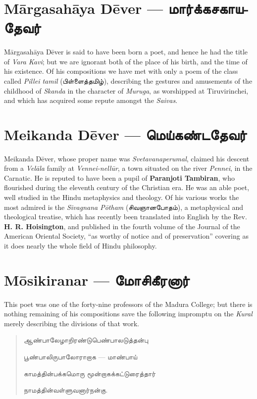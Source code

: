 \documentclass{article}
\newcommand{\TamilText}[1]{\texttamil{#1}}
\newcommand{\TamilBold}[1]{\texttamil{\textbf{#1}}}
\newcommand{\tam}[1]{\TamilText{#1}}
\newcommand{\tambold}[1]{\TamilBold{#1}}
\begin{document}
\section{M\={a}rgasah\={a}ya D\={e}ver --- \tambold{மார்க்கசகாயதேவர்}}
\paragraph{}
M\={a}rgasah\={a}ya D\={e}ver is said to have been born a poet, and hence he had the title of \emph{Vara Kavi}; but we are ignorant both of the place of his birth, and the time of his existence. Of his compositions we have met with only a poem of the class called \emph{Pillei tamil} (\tam{பிள்ளைத்தமிழ்}), describing the gestures and amusements of the childhood of \emph{Skanda} in the character of \emph{Muruga}, as worshipped at Tiruvirinchei, and which has acquired some repute amongst the \emph{Saivas}.

\section{Meikanda D\={e}ver --- \tambold{மெய்கண்டதேவர்}}
\paragraph{}
Meikanda D\={e}ver, whose proper name was \emph{Svetavanaperumal}, claimed his descent from a \emph{Vel\={a}la} family at \emph{Vennei-nell\={u}r}, a town situated on the river \emph{Pennei}, in the Carnatic. He is reputed to have been a pupil of \textbf{Paranjoti Tambiran}, who flourished during the eleventh century of the Christian era. He was an able poet, well studied in the Hindu metaphysics and theology. Of his various works the most admired is the \emph{Sivagnana P\={o}tham} (\tam{சிவஞானபோதம்}), a metaphysical and theological treatise, which has recently been translated into English by the Rev. \textbf{H. R. Hoisington}, and published in the fourth volume of the Journal of the American Oriental Society, ``as worthy of notice and of preservation'' covering as it does nearly the whole field of Hindu philosophy.

\section{M\={o}sikiranar --- \tambold{மோசிகீரனார்}}
\paragraph{}
This poet was one of the forty-nine professors of the Madura College; but there is nothing remaining of his compositions save the following impromptu on the \emph{Kural} merely describing the divisions of that work.
\begin{quotation}\small
\tam{ஆண்பாலேழாறிரண்டுபெண்பாலடுத்தன்பு}

\tam{பூண்‌பாலிருபாலோராறாக} --- \tam{மாண்பாய்‌}

\tam{காமத்தின்பக்கமொரு மூன்றாகக்கட்டுரைத்தார்‌}

\tam{நாமத்தின்வள்ளுவனார்நன்கு}.
\end{quotation}
\end{document}
